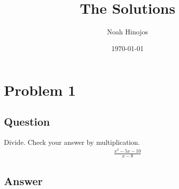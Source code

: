 \documentclass[12pt]{article}
\title{
  The Solutions
  }
\author{Noah Hinojos}
\date{\today}
\begin{document}
\maketitle


\section*{Problem 1}
\subsection*{Question}
Divide. Check your answer by multiplication. \\
\begin{align*}
  \frac{x^2 -5x - 10}{x-8}
\end{align*}

\subsection*{Answer}
\end{document}
